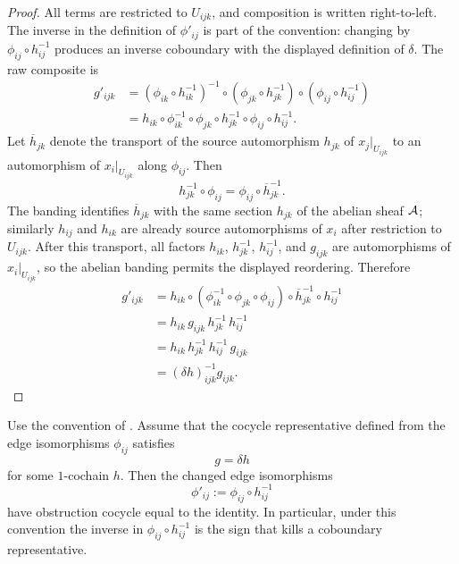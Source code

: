 \begin{proof}
All terms are restricted to $U_{ijk}$, and composition is written right-to-left. The inverse in the definition of $\phi'_{ij}$ is part of the convention: changing by $\phi_{ij}\circ h_{ij}^{-1}$ produces an inverse coboundary with the displayed definition of $\delta$. The raw composite is
\[
\begin{aligned}
g'_{ijk}
&=(\phi_{ik}\circ h_{ik}^{-1})^{-1}
\circ(\phi_{jk}\circ h_{jk}^{-1})
\circ(\phi_{ij}\circ h_{ij}^{-1})\\
&=h_{ik}\circ\phi_{ik}^{-1}\circ\phi_{jk}\circ h_{jk}^{-1}\circ\phi_{ij}\circ h_{ij}^{-1}.
\end{aligned}
\]
Let $\overline{h}_{jk}$ denote the transport of the source automorphism $h_{jk}$ of $x_j|_{U_{ijk}}$ to an automorphism of $x_i|_{U_{ijk}}$ along $\phi_{ij}$. Then
\[
h_{jk}^{-1}\circ \phi_{ij}
=
\phi_{ij}\circ \overline{h}_{jk}^{-1}.
\]
The banding identifies $\overline{h}_{jk}$ with the same section $h_{jk}$ of the abelian sheaf $\mathcal{A}$; similarly $h_{ij}$ and $h_{ik}$ are already source automorphisms of $x_i$ after restriction to $U_{ijk}$. After this transport, all factors $h_{ik}$, $h_{jk}^{-1}$, $h_{ij}^{-1}$, and $g_{ijk}$ are automorphisms of $x_i|_{U_{ijk}}$, so the abelian banding permits the displayed reordering. Therefore
\[
\begin{aligned}
g'_{ijk}
&=h_{ik}\circ
(\phi_{ik}^{-1}\circ\phi_{jk}\circ\phi_{ij})
\circ \overline{h}_{jk}^{-1}
\circ h_{ij}^{-1}\\
&=h_{ik}\,g_{ijk}\,h_{jk}^{-1}\,h_{ij}^{-1}\\
&=h_{ik}\,h_{jk}^{-1}\,h_{ij}^{-1}\,g_{ijk}\\
&=(\delta h)_{ijk}^{-1}g_{ijk}.
\end{aligned}
\]
\end{proof}

\begin{corollary}\label{cor:neutralizing-coboundary-representative}
Use the convention of . Assume that the
cocycle representative defined from the edge isomorphisms $\phi_{ij}$ satisfies
\[
g=\delta h
\]
for some $1$-cochain $h$. Then the changed edge isomorphisms
\[
\phi'_{ij}:=\phi_{ij}\circ h_{ij}^{-1}
\]
have obstruction cocycle equal to the identity. In particular, under this
convention the inverse in $\phi_{ij}\circ h_{ij}^{-1}$ is the sign that kills a
coboundary representative.
\end{corollary}

